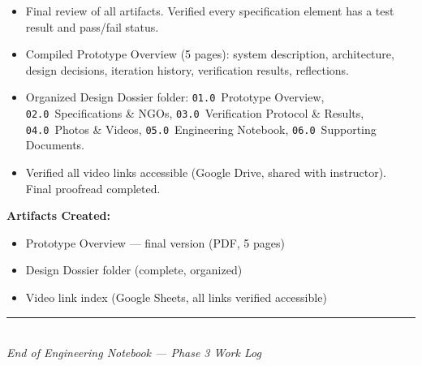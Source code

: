 \documentclass[12pt, letterpaper]{article}
\newcommand{\artifacts}{\par\vspace{1pt}\textbf{Artifacts Created:}\vspace{0pt}}
\begin{document}
\begin{itemize}
  \item Final review of all artifacts. Verified every specification element has a test result and pass/fail status.
  \item Compiled Prototype Overview (5 pages): system description, architecture, design decisions, iteration history, verification results, reflections.
  \item Organized Design Dossier folder: \texttt{01.0}~Prototype Overview, \texttt{02.0}~Specifications \& NGOs, \texttt{03.0}~Verification Protocol \& Results, \texttt{04.0}~Photos \& Videos, \texttt{05.0}~Engineering Notebook, \texttt{06.0}~Supporting Documents.
  \item Verified all video links accessible (Google Drive, shared with instructor). Final proofread completed.
\end{itemize}

\artifacts
\begin{itemize}
  \item Prototype Overview --- final version (PDF, 5 pages)
  \item Design Dossier folder (complete, organized)
  \item Video link index (Google Sheets, all links verified accessible)
\end{itemize}

\vfill
\begin{center}
  \textcolor{rulegray}{\rule{0.5\linewidth}{0.4pt}}\\[4pt]
  {\small\textit{End of Engineering Notebook --- Phase 3 Work Log}}
\end{center}
\end{document}
